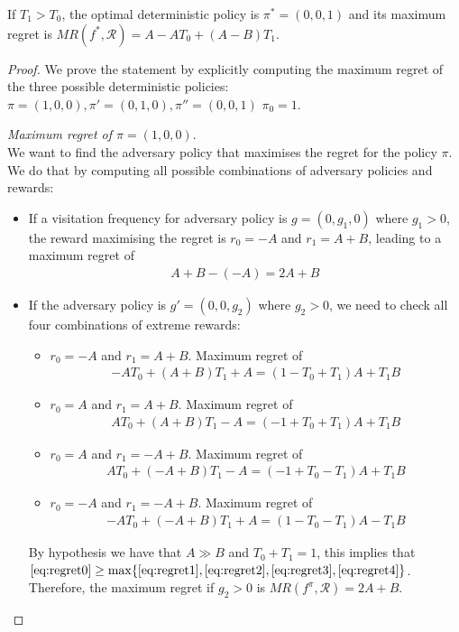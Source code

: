 \begin{proposition}\label{theorem:opt_det}
If $T_1 > T_0$, the optimal deterministic policy is $\pi^* = (0, 0, 1)$ and its maximum regret is $MR(f^*, \mathcal{R}) = A- A T_0 +(A-B) T_1$. 
\end{proposition}
\begin{proof}
We prove the statement by explicitly computing the maximum regret of the three possible deterministic policies:$\pi = (1, 0, 0), \pi' =(0, 1, 0), \pi''= (0, 0, 1)$ $\pi_0=1$.

\textit{Maximum regret of $\pi = (1, 0, 0)$}.\\
We want to find the adversary policy that maximises the regret for the policy $\pi$. We do that by computing all possible combinations of adversary policies and rewards:
\begin{itemize}
\item If a visitation frequency for adversary policy is $g = (0, g_1, 0)$ where $g_1> 0$, the reward maximising the regret is $r_0 = -A$ and $r_1 = A+B$, leading to a maximum regret of 
\begin{align}
A+B-(-A)=2A+B \label{eq:regret0}
\end{align}
\item If the adversary policy is $g' = (0, 0, g_2)$ where $g_2>0$, we need to check all four combinations of extreme rewards:
\begin{itemize}
\item $r_0 = -A$ and $r_1= A+B$. Maximum regret of
\begin{align}
-A T_0 + (A+B)T_1 + A = (1-T_0 + T_1)A + T_1 B \label{eq:regret1}
\end{align}
\item $r_0 = A$ and $r_1= A+B$. Maximum regret of
\begin{align}
A T_0 + (A+B)T_1 - A = (-1+T_0 + T_1)A + T_1 B  \label{eq:regret2}
\end{align}
\item $r_0 = A$ and $r_1= -A+B$. Maximum regret of
\begin{align} 
A T_0 + (-A+B)T_1 - A =  (-1+T_0 - T_1)A + T_1 B \label{eq:regret3}
\end{align}
\item $r_0 = -A$ and $r_1= -A+B$. Maximum regret of
\begin{align}
-A T_0 + (-A+B)T_1 + A =  (1 - T_0 - T_1)A - T_1 B \label{eq:regret4}
\end{align}
\end{itemize} 
By hypothesis we have that $A\gg B$ and $T_0+T_1= 1$, this implies that $\eqref{eq:regret0} \geq \max\{\eqref{eq:regret1}, \eqref{eq:regret2}, \eqref{eq:regret3}, \eqref{eq:regret4} \}$. Therefore, the maximum regret if $g_2>0$ is $MR(f^{\pi}, \mathcal{R}) = 2A+B$.
\end{itemize} 


\end{proof}
